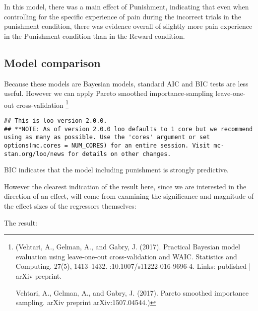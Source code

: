 \documentclass[]{article}
\let\rmarkdownfootnote\footnote%
\def\footnote{\protect\rmarkdownfootnote}
\begin{document}
In this model, there was a main effect of Punishment, indicating that
even when controlling for the specific experience of pain during the
incorrect trials in the punishment condition, there was evidence overall
of slightly more pain experience in the Punishment condition than in the
Reward condition.

\subsection{Model comparison}\label{model-comparison}

Because these models are Bayesian models, standard AIC and BIC tests are
less useful. However we can apply Pareto smoothed importance-sampling
leave-one-out cross-validation
\footnote{(Vehtari, A., Gelman, A., and Gabry, J. (2017). Practical Bayesian model evaluation using leave-one-out cross-validation and WAIC. Statistics and Computing. 27(5), 1413–1432. :10.1007/s11222-016-9696-4. Links: published | arXiv preprint.

Vehtari, A., Gelman, A., and Gabry, J. (2017). Pareto smoothed importance sampling. arXiv preprint arXiv:1507.04544.)}

\begin{verbatim}
## This is loo version 2.0.0.
## **NOTE: As of version 2.0.0 loo defaults to 1 core but we recommend using as many as possible. Use the 'cores' argument or set options(mc.cores = NUM_CORES) for an entire session. Visit mc-stan.org/loo/news for details on other changes.
\end{verbatim}

BIC indicates that the model including punishment is strongly
predictive.

However the clearest indication of the result here, since we are
interested in the direction of an effect, will come from examining the
significance and magnitude of the effect sizes of the regressors
themselves:

The result:
\end{document}
